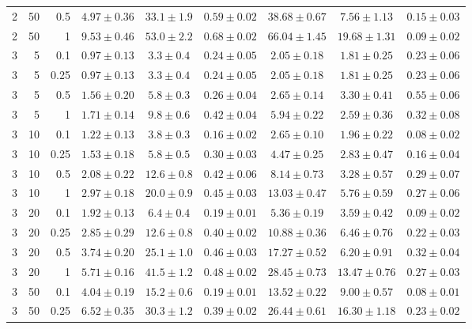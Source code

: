 \begin{table}[htbp]
\begin{tabular}{@{}rrrcccccc@{}}
2 & 50 & 0.5 & $4.97 \pm 0.36$ & $33.1 \pm 1.9$ & $0.59 \pm 0.02$ & $38.68 \pm 0.67$ & $7.56 \pm 1.13$ & $0.15 \pm 0.03$ \\
2 & 50 & 1 & $9.53 \pm 0.46$ & $53.0 \pm 2.2$ & $0.68 \pm 0.02$ & $66.04 \pm 1.45$ & $19.68 \pm 1.31$ & $0.09 \pm 0.02$ \\
\midrule
3 & 5 & 0.1 & $0.97 \pm 0.13$ & $3.3 \pm 0.4$ & $0.24 \pm 0.05$ & $2.05 \pm 0.18$ & $1.81 \pm 0.25$ & $0.23 \pm 0.06$ \\
3 & 5 & 0.25 & $0.97 \pm 0.13$ & $3.3 \pm 0.4$ & $0.24 \pm 0.05$ & $2.05 \pm 0.18$ & $1.81 \pm 0.25$ & $0.23 \pm 0.06$ \\
3 & 5 & 0.5 & $1.56 \pm 0.20$ & $5.8 \pm 0.3$ & $0.26 \pm 0.04$ & $2.65 \pm 0.14$ & $3.30 \pm 0.41$ & $0.55 \pm 0.06$ \\
3 & 5 & 1 & $1.71 \pm 0.14$ & $9.8 \pm 0.6$ & $0.42 \pm 0.04$ & $5.94 \pm 0.22$ & $2.59 \pm 0.36$ & $0.32 \pm 0.08$ \\
3 & 10 & 0.1 & $1.22 \pm 0.13$ & $3.8 \pm 0.3$ & $0.16 \pm 0.02$ & $2.65 \pm 0.10$ & $1.96 \pm 0.22$ & $0.08 \pm 0.02$ \\
3 & 10 & 0.25 & $1.53 \pm 0.18$ & $5.8 \pm 0.5$ & $0.30 \pm 0.03$ & $4.47 \pm 0.25$ & $2.83 \pm 0.47$ & $0.16 \pm 0.04$ \\
3 & 10 & 0.5 & $2.08 \pm 0.22$ & $12.6 \pm 0.8$ & $0.42 \pm 0.06$ & $8.14 \pm 0.73$ & $3.28 \pm 0.57$ & $0.29 \pm 0.07$ \\
3 & 10 & 1 & $2.97 \pm 0.18$ & $20.0 \pm 0.9$ & $0.45 \pm 0.03$ & $13.03 \pm 0.47$ & $5.76 \pm 0.59$ & $0.27 \pm 0.06$ \\
3 & 20 & 0.1 & $1.92 \pm 0.13$ & $6.4 \pm 0.4$ & $0.19 \pm 0.01$ & $5.36 \pm 0.19$ & $3.59 \pm 0.42$ & $0.09 \pm 0.02$ \\
3 & 20 & 0.25 & $2.85 \pm 0.29$ & $12.6 \pm 0.8$ & $0.40 \pm 0.02$ & $10.88 \pm 0.36$ & $6.46 \pm 0.76$ & $0.22 \pm 0.03$ \\
3 & 20 & 0.5 & $3.74 \pm 0.20$ & $25.1 \pm 1.0$ & $0.46 \pm 0.03$ & $17.27 \pm 0.52$ & $6.20 \pm 0.91$ & $0.32 \pm 0.04$ \\
3 & 20 & 1 & $5.71 \pm 0.16$ & $41.5 \pm 1.2$ & $0.48 \pm 0.02$ & $28.45 \pm 0.73$ & $13.47 \pm 0.76$ & $0.27 \pm 0.03$ \\
3 & 50 & 0.1 & $4.04 \pm 0.19$ & $15.2 \pm 0.6$ & $0.19 \pm 0.01$ & $13.52 \pm 0.22$ & $9.00 \pm 0.57$ & $0.08 \pm 0.01$ \\
3 & 50 & 0.25 & $6.52 \pm 0.35$ & $30.3 \pm 1.2$ & $0.39 \pm 0.02$ & $26.44 \pm 0.61$ & $16.30 \pm 1.18$ & $0.23 \pm 0.02$ \\

\end{tabular}
\end{table}
